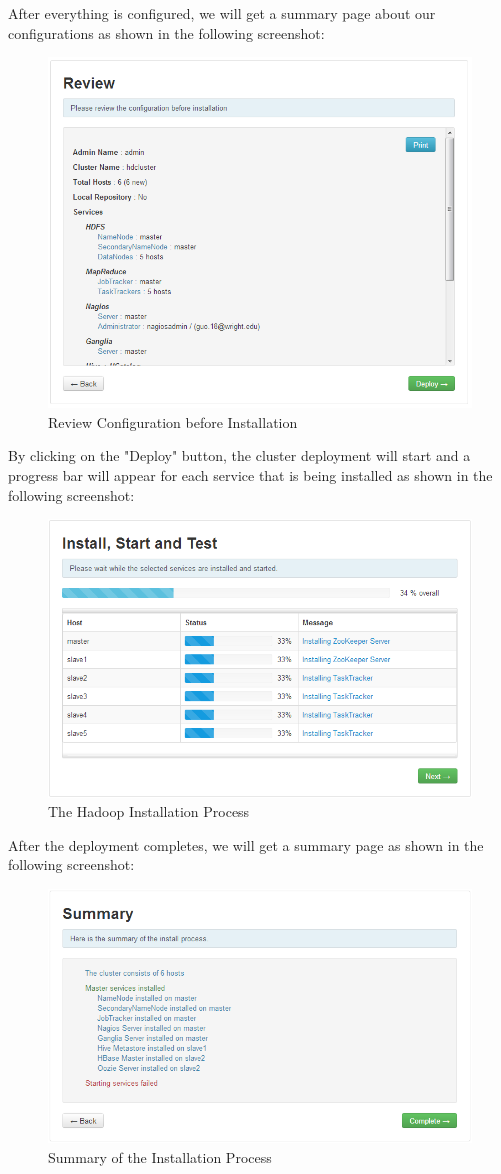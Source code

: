 After everything is configured, we will get a summary page about our configurations as shown in the following screenshot:
\begin{figure}[ht]
  \centering
  \includegraphics[width=.8\textwidth]{figs/5163os_06_22.png}
  \caption{Review Configuration before Installation}\label{fig:config.review}
\end{figure} 
By clicking on the "Deploy" button, the cluster deployment will start and a progress bar will appear for each service that is being installed as shown in the following screenshot:
\begin{figure}[ht]
  \centering
  \includegraphics[width=.8\textwidth]{figs/5163os_06_24.png}
  \caption{The Hadoop Installation Process}\label{fig:hadoop.install.process}
\end{figure} 
After the deployment completes, we will get a summary page as shown in the following screenshot:
\begin{figure}[ht]
  \centering
  \includegraphics[width=.8\textwidth]{figs/5163os_06_26.png}
  \caption{Summary of the Installation Process}\label{fig:install.summary}
\end{figure} 
